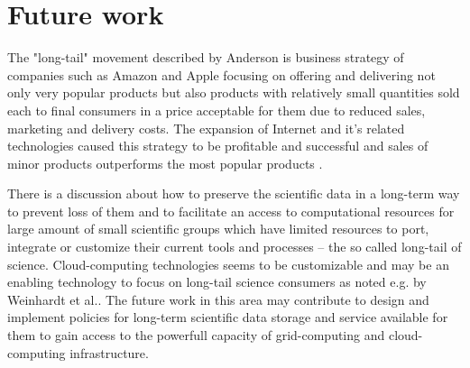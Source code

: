 
\section{Future work}

The "long-tail" movement described by Anderson \cite{Anderson2006} is business strategy of companies such as Amazon and Apple focusing on offering and delivering not only very popular products but also products with relatively small quantities sold each to final consumers in a price acceptable for them  due to reduced sales, marketing and delivery costs. The expansion of Internet and it's related technologies caused this strategy to be profitable and successful and sales of minor products outperforms the most popular products .

 
There is a discussion about how to preserve the scientific data in a long-term way to prevent loss of them  \cite{Vines2014,P.BryanHeidorn2008} and to facilitate an access to computational resources for large amount of small scientific groups which have limited resources to port, integrate or customize their current tools and processes -- the so called long-tail of science. Cloud-computing technologies seems to be customizable and may be an enabling technology to focus on long-tail science consumers as noted e.g. by Weinhardt et al.\cite{Weinhardt2009}. The future work in this area may contribute to design and implement policies for long-term scientific data storage and service available for them to gain access to the powerfull capacity of grid-computing and cloud-computing infrastructure. 

